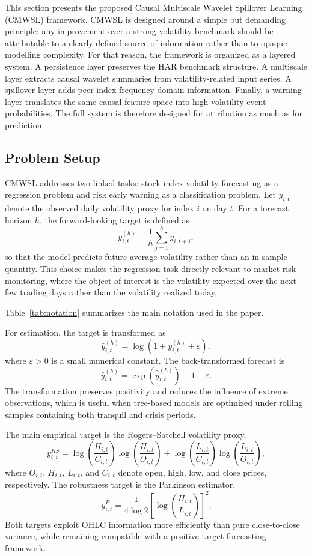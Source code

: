 This section presents the proposed Causal Multiscale Wavelet Spillover Learning (CMWSL) framework. CMWSL is designed around a simple but demanding principle: any improvement over a strong volatility benchmark should be attributable to a clearly defined source of information rather than to opaque modelling complexity. For that reason, the framework is organized as a layered system. A persistence layer preserves the HAR benchmark structure. A multiscale layer extracts causal wavelet summaries from volatility-related input series. A spillover layer adds peer-index frequency-domain information. Finally, a warning layer translates the same causal feature space into high-volatility event probabilities. The full system is therefore designed for attribution as much as for prediction.

\subsection{Problem Setup}

CMWSL addresses two linked tasks: stock-index volatility forecasting as a regression problem and risk early warning as a classification problem. Let \(y_{i,t}\) denote the observed daily volatility proxy for index \(i\) on day \(t\). For a forecast horizon \(h\), the forward-looking target is defined as
\[
y_{i,t}^{(h)}=\frac{1}{h}\sum_{j=1}^{h} y_{i,t+j},
\]
so that the model predicts future average volatility rather than an in-sample quantity. This choice makes the regression task directly relevant to market-risk monitoring, where the object of interest is the volatility expected over the next few trading days rather than the volatility realized today.

Table~\ref{tab:notation} summarizes the main notation used in the paper.



For estimation, the target is transformed as
\[
\bar y_{i,t}^{(h)}=\log\left(1+y_{i,t}^{(h)}+\varepsilon\right),
\]
where \(\varepsilon>0\) is a small numerical constant. The back-transformed forecast is
\[
\hat y_{i,t}^{(h)}=\exp\left(\widehat{\bar y}_{i,t}^{(h)}\right)-1-\varepsilon.
\]
The transformation preserves positivity and reduces the influence of extreme observations, which is useful when tree-based models are optimized under rolling samples containing both tranquil and crisis periods.

The main empirical target is the Rogers--Satchell volatility proxy,
\[
y_{i,t}^{RS}
=
\log\!\left(\frac{H_{i,t}}{C_{i,t}}\right)\log\!\left(\frac{H_{i,t}}{O_{i,t}}\right)
+
\log\!\left(\frac{L_{i,t}}{C_{i,t}}\right)\log\!\left(\frac{L_{i,t}}{O_{i,t}}\right),
\]
where \(O_{i,t}\), \(H_{i,t}\), \(L_{i,t}\), and \(C_{i,t}\) denote open, high, low, and close prices, respectively. The robustness target is the Parkinson estimator,
\[
y_{i,t}^{P}=\frac{1}{4\log 2}\left[\log\!\left(\frac{H_{i,t}}{L_{i,t}}\right)\right]^2.
\]
Both targets exploit OHLC information more efficiently than pure close-to-close variance, while remaining compatible with a positive-target forecasting framework.

